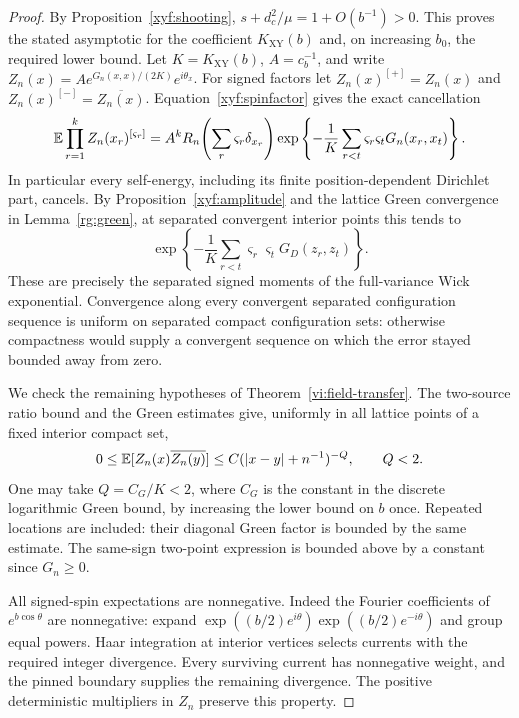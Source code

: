 \begin{proof}
By Proposition~\ref{xyf:shooting},
\(s+d_c^2/\mu=1+O(b^{-1})>0\).  This proves the stated asymptotic
for the coefficient \(K_{\mathrm{XY}}(b)\) and, on increasing \(b_0\),
the required lower bound.
Let \(K=K_{\mathrm{XY}}(b)\), \(A=c_b^{-1}\), and write
\(Z_n(x)=A e^{G_n(x,x)/(2K)}e^{i\theta_x}\).
For signed factors let \(Z_n(x)^{[+]}=Z_n(x)\) and
\(Z_n(x)^{[-]}=\overline{Z_n(x)}\).  Equation~\eqref{xyf:spinfactor}
gives the exact cancellation
\begin{equation}
 \mathbb E\prod_{r=1}^k Z_n(x_r)^{[\varsigma_r]}
  =A^k R_n\!\left(\sum_r\varsigma_r\delta_{x_r}\right)
    \exp\left\{-\frac1K\sum_{r<t}
                      \varsigma_r\varsigma_tG_n(x_r,x_t)\right\}.
 \label{xyf:wickcancel}
\end{equation}
In particular every self-energy, including its finite
position-dependent Dirichlet part, cancels.  By
Proposition~\ref{xyf:amplitude} and the lattice Green convergence
in Lemma~\ref{rg:green}, at separated convergent interior points
this tends to
\[
 \exp\left\{-\frac1K\sum_{r<t}
                   \varsigma_r\varsigma_tG_D(z_r,z_t)\right\}.
\]
These are precisely the separated signed moments of the full-variance
Wick exponential.  Convergence along every convergent separated
configuration sequence is uniform on separated compact configuration
sets: otherwise compactness would supply a convergent sequence on
which the error stayed bounded away from zero.

We check the remaining hypotheses of Theorem~\ref{vi:field-transfer}.
The two-source ratio bound and the Green estimates give, uniformly
in all lattice points of a fixed interior compact set,
\begin{equation}
 0\le\mathbb E[Z_n(x)\overline{Z_n(y)}]
        \le C(|x-y|+n^{-1})^{-Q},\qquad Q<2.
 \label{xyf:twopoint}
\end{equation}
One may take \(Q=C_G/K<2\), where \(C_G\) is the constant in the
discrete logarithmic Green bound, by increasing the lower bound on
\(b\) once.  Repeated
locations are included: their diagonal Green factor is bounded by
the same estimate.  The same-sign two-point expression is bounded
above by a constant since \(G_n\ge0\).

All signed-spin expectations are nonnegative.  Indeed the Fourier
coefficients of \(e^{b\cos\theta}\) are nonnegative: expand
\(\exp((b/2)e^{i\theta})\exp((b/2)e^{-i\theta})\) and group equal
powers.  Haar integration at interior vertices selects currents
with the required integer divergence.  Every surviving current
has nonnegative weight, and the pinned boundary supplies the
remaining divergence.  The positive deterministic multipliers in
\(Z_n\) preserve this property.


\end{proof}
